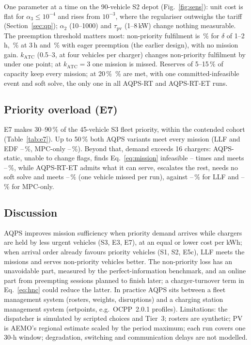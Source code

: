 \documentclass[preprint,12pt]{elsarticle}
\begin{document}
One parameter at a time on the 90-vehicle S2 depot (Fig.~\ref{fig:sens}): unit cost is flat for
$\alpha_3\le10^{-4}$ and rises from $10^{-3}$, where the regulariser outweighs the tariff
(Section~\ref{sec:qp}); $\alpha_2$ (10--1000) and $\tau_{\mathrm{pv}}$ (1--8\,kW) change nothing measurable. The
preemption threshold matters most: non-priority fulfilment is \RDeltaTwoNonPri\,\% for $\delta$ of 1--2\,h,
\RDeltaThreeNonPri\,\% at 3\,h and \RDeltaEagerNonPri\,\% with eager preemption (the earlier design), with no
mission gain. $k_{\mathrm{ATC}}$ (0.5--3, at four vehicles per charger) changes non-priority fulfilment by under
one point; at $k_{\mathrm{ATC}}=3$ one mission is missed. Reserves of 5--15\,\% of capacity keep every mission;
at 20\,\% \RReserveTwentyMission\,\% are met, with one committed-infeasible event and soft solve, the only one
in all AQPS-RT and AQPS-RT-ET runs.

\subsection{Priority overload (E7)}
\label{sec:res_overload}



E7 makes 30--90\,\% of the 45-vehicle S3 fleet priority, within the contended cohort (Table~\ref{tab:e7}). Up
to 50\,\% both AQPS variants meet every mission (LLF and EDF
\RLowShareMissionMinLLFEDF--\RLowShareMissionMaxLLFEDF\,\%, MPC-only
\RLowShareMissionMinMPC--\RLowShareMissionMaxMPC\,\%). Beyond that, demand exceeds 16 chargers: AQPS-static,
unable to change flags, finds Eq.~\eqref{eq:mission} infeasible
\ROverloadSoftMinStatic--\ROverloadSoftMaxStatic{} times and meets
\ROverloadMissionMinStatic--\ROverloadMissionMaxStatic\,\%, while AQPS-RT-ET admits what it can serve,
escalates the rest, needs no soft solve and meets \ROverloadMissionMinRTET--\ROverloadMissionMaxRTET\,\%
(one vehicle missed per run), against \ROverloadMissionMinLLF--\ROverloadMissionMaxLLF\,\% for LLF and
\ROverloadMissionMinMPC--\ROverloadMissionMaxMPC\,\% for MPC-only.

\subsection{Discussion}
\label{sec:discussion}
AQPS improves mission sufficiency when priority demand arrives while chargers are held by less urgent
vehicles (S3, E3, E7), at an equal or lower cost per kWh; when arrival order already favours priority vehicles
(S1, S2, E5c), LLF meets the missions and serves non-priority vehicles better. The non-priority loss has an
unavoidable part, measured by the perfect-information benchmark, and an online part from preempting sessions
planned to finish later; a charger-turnover term in Eq.~\eqref{eq:hnc} could reduce the latter. In practice
AQPS sits between a fleet management system (rosters, weights, disruptions) and a charging station management
system (setpoints, e.g.\ OCPP~2.0.1 profiles). Limitations: the dispatcher is simulated by scripted choices and
Tier~3; rosters are synthetic; PV is AEMO's regional estimate scaled by the period maximum; each run covers one
30-h window; degradation, switching and communication delays are not modelled.
\end{document}
